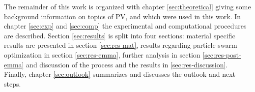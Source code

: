 The remainder of this work is organized with chapter 
\ref{sec:theoretical} giving 
some background information on topics of PV,  and  which were used in this work. 
In chapter \ref{sec:exp} and \ref{sec:comp} the experimental and computational procedures are described. 
Section \ref{sec:results} is split into four sections: material specific results are presented in section \ref{sec:res-mat}, results regarding particle swarm optimization in section \ref{sec:res-emma}, further analysis in section \ref{sec:res-post-emma} and discussion of the process and the results in \ref{sec:res-discussion}.
Finally, chapter \ref{sec:outlook} summarizes and discusses the outlook and next steps.

